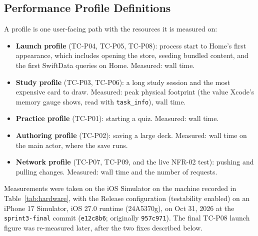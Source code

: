 \documentclass[12pt,letterpaper]{article}
\begin{document}
\subsection{Performance Profile Definitions}
A profile is one user-facing path with the resources it is measured on:
\begin{itemize}
  \item \textbf{Launch profile} (TC-P04, TC-P05, TC-P08): process start to Home's first
        appearance, which includes opening the store, seeding bundled content, and the
        first SwiftData queries on Home. Measured: wall time.
  \item \textbf{Study profile} (TC-P03, TC-P06): a long study session and the most
        expensive card to draw. Measured: peak physical footprint (the value Xcode's
        memory gauge shows, read with \texttt{task\_info}), wall time.
  \item \textbf{Practice profile} (TC-P01): starting a quiz. Measured: wall time.
  \item \textbf{Authoring profile} (TC-P02): saving a large deck. Measured: wall time
        on the main actor, where the save runs.
  \item \textbf{Network profile} (TC-P07, TC-P09, and the live NFR-02 test): pushing
        and pulling changes. Measured: wall time and the number of requests.
\end{itemize}
Measurements were taken on the iOS Simulator on the machine recorded in
Table~\ref{tab:hardware}, with the Release configuration (testability enabled) on an
iPhone 17 Simulator, iOS 27.0 runtime (24A5370g), on Oct 31, 2026 at the
\texttt{sprint3-final} commit (\texttt{e12c8b6}; originally \texttt{957c971}). The final
TC-P08 launch figure was re-measured later, after the two fixes described below.
\end{document}
